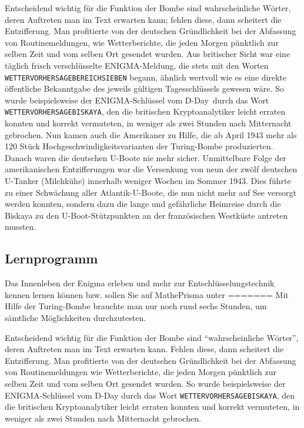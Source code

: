 \documentclass[%
<<<<<<< Updated upstream
11pt,%
twoside,%
titlepage,%
german,%
headsepline%
]{scrartcl}
\begin{document}
Entscheidend wichtig für die Funktion der Bombe sind \grqq wahrscheinliche Wörter\grqq, deren Auftreten man im Text erwarten kann; fehlen diese, dann scheitert die Entzifferung.
Man profitierte von der deutschen Gründlichkeit bei der Abfassung von Routinemeldungen, wie Wetterberichte, die jeden Morgen pünktlich zur selben Zeit und vom selben Ort gesendet wurden. Aus britischer Sicht war eine täglich frisch verschlüsselte ENIGMA-Meldung, die stets mit den Worten \texttt{WETTERVORHERSAGEBEREICHSIEBEN} begann, ähnlich wertvoll wie es eine direkte öffentliche Bekanntgabe des jeweils gültigen Tagesschlüssels gewesen wäre. So wurde beispielsweise der ENIGMA-Schlüssel vom \glqq D-Day\grqq\ durch das Wort \texttt{WETTERVORHERSAGEBISKAYA}, den die britischen Kryptoanalytiker leicht erraten konnten und korrekt vermuteten, in weniger als zwei Stunden nach Mitternacht gebrochen.
Nun kamen auch die Amerikaner zu Hilfe, die ab April 1943 mehr als 120 Stück Hochgeschwindigkeitsvarianten der Turing-Bombe produzierten. Danach waren die deutschen U-Boote nie mehr sicher. Unmittelbare Folge der amerikanischen Entzifferungen war die Versenkung von neun der zwölf deutschen U-Tanker (\glqq Milchkühe\grqq) innerhalb weniger Wochen im Sommer 1943. Dies führte zu einer Schwächung aller Atlantik-U-Boote, die nun nicht mehr auf See versorgt werden konnten, sondern dazu die lange und gefährliche Heimreise durch die Biskaya zu den U-Boot-Stützpunkten an der französischen Westküste antreten mussten.

\subsection{Lernprogramm}
Das Innenleben der Enigma erleben und mehr zur Entschlüsselungstechnik kennen lernen k\"onnen bzw. sollen Sie auf MathePrisma unter
=======
Mit Hilfe der Turing-Bombe brauchte man nur noch rund sechs Stunden, um sämtliche Mög\-lich\-kei\-ten durchzutesten.

Entscheidend wichtig für die Funktion der Bombe sind \enquote{wahrscheinliche Wörter}, deren Auftreten man im Text erwarten kann. Fehlen diese, dann scheitert die Entzifferung.
Man profitierte von der deutschen Gründlichkeit bei der Abfassung von Routinemeldungen wie Wetterberichte, die jeden Morgen pünktlich zur selben Zeit und vom selben Ort gesendet wurden. So wurde beispielsweise der ENIGMA-Schlüssel vom D-Day durch das Wort \texttt{WETTERVORHERSAGEBISKAYA}, den die britischen Kryptoanalytiker leicht erraten konnten und korrekt vermuteten, in weniger als zwei Stunden nach Mitternacht gebrochen.
\end{document}
